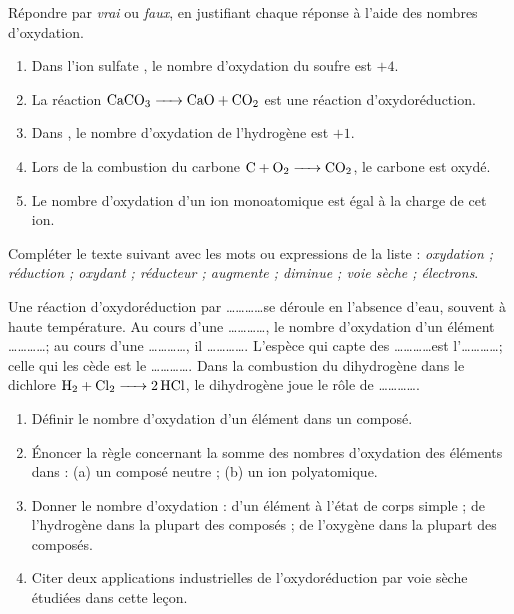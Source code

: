 \documentclass[11pt]{article}
\newcommand{\cle}[1]{{\popxbold\color{popdark}#1}}
\begin{document}
\begin{exercice}
Répondre par \emph{vrai} ou \emph{faux}, en justifiant chaque réponse à l'aide des nombres d'oxydation.
\begin{enumerate}
\item Dans l'ion sulfate , le nombre d'oxydation du soufre est $+4$.
\item La réaction $\ce{CaCO3 -> CaO + CO2}$ est une réaction d'oxydoréduction.
\item Dans , le nombre d'oxydation de l'hydrogène est $+1$.
\item Lors de la combustion du carbone $\ce{C + O2 -> CO2}$, le carbone est oxydé.
\item Le nombre d'oxydation d'un ion monoatomique est égal à la charge de cet ion.
\end{enumerate}
\end{exercice}

\begin{exercice}
Compléter le texte suivant avec les mots ou expressions de la liste : \emph{oxydation ; réduction ; oxydant ; réducteur ; augmente ; diminue ; voie sèche ; électrons}.

Une réaction d'oxydoréduction par \ldots\ldots\ldots\ldots se déroule en l'absence d'eau, souvent à haute température. Au cours d'une \ldots\ldots\ldots\ldots, le nombre d'oxydation d'un élément \ldots\ldots\ldots\ldots ; au cours d'une \ldots\ldots\ldots\ldots, il \ldots\ldots\ldots\ldots. L'espèce qui capte des \ldots\ldots\ldots\ldots est l'\ldots\ldots\ldots\ldots ; celle qui les cède est le \ldots\ldots\ldots\ldots. Dans la combustion du dihydrogène dans le dichlore $\ce{H2 + Cl2 -> 2 HCl}$, le dihydrogène joue le rôle de \ldots\ldots\ldots\ldots.
\end{exercice}

\begin{exercice}
\begin{enumerate}
\item Définir le \cle{nombre d'oxydation} d'un élément dans un composé.
\item Énoncer la règle concernant la somme des nombres d'oxydation des éléments dans : (a) un composé neutre ; (b) un ion polyatomique.
\item Donner le nombre d'oxydation : d'un élément à l'état de corps simple ; de l'hydrogène dans la plupart des composés ; de l'oxygène dans la plupart des composés.
\item Citer deux applications industrielles de l'oxydoréduction par voie sèche étudiées dans cette leçon.
\end{enumerate}
\end{exercice}
\end{document}

